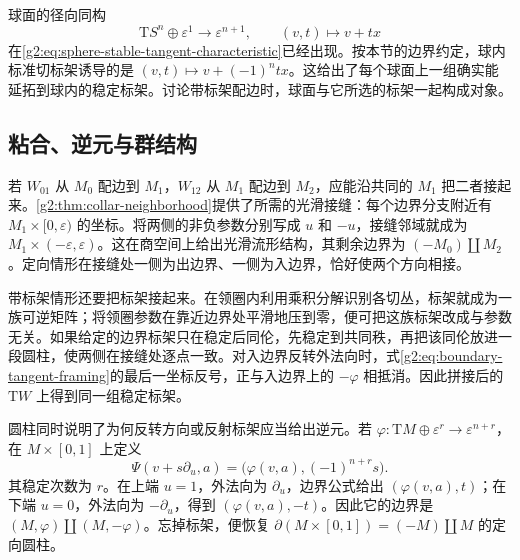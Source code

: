球面的径向同构
\[
	\mathrm TS^n\oplus\varepsilon^1\longrightarrow\varepsilon^{n+1},\qquad(v,t)\longmapsto v+tx
\]
在\cref{g2:eq:sphere-stable-tangent-characteristic}已经出现。按本节的边界约定，球内标准切标架诱导的是 \((v,t)\mapsto v+(-1)^ntx\)。这给出了每个球面上一组确实能延拓到球内的稳定标架。讨论带标架配边时，球面与它所选的标架一起构成对象。

\subsection{粘合、逆元与群结构}
\label{g2:subsec:2301:02}
若 \(W_{01}\) 从 \(M_0\) 配边到 \(M_1\)，\(W_{12}\) 从 \(M_1\) 配边到 \(M_2\)，应能沿共同的 \(M_1\) 把二者接起来。\cref{g2:thm:collar-neighborhood}提供了所需的光滑接缝：每个边界分支附近有 \(M_1\times[0,\varepsilon)\) 的坐标。将两侧的非负参数分别写成 \(u\) 和 \(-u\)，接缝邻域就成为 \(M_1\times(-\varepsilon,\varepsilon)\)。这在商空间上给出光滑流形结构，其剩余边界为 \((-M_0)\amalg M_2\)。定向情形在接缝处一侧为出边界、一侧为入边界，恰好使两个方向相接。

带标架情形还要把标架接起来。在领圈内利用乘积分解识别各切丛，标架就成为一族可逆矩阵；将领圈参数在靠近边界处平滑地压到零，便可把这族标架改成与参数无关。如果给定的边界标架只在稳定后同伦，先稳定到共同秩，再把该同伦放进一段圆柱，使两侧在接缝处逐点一致。对入边界反转外法向时，式\eqref{g2:eq:boundary-tangent-framing}的最后一坐标反号，正与入边界上的 \(-\varphi\) 相抵消。因此拼接后的 \(\mathrm TW\) 上得到同一组稳定标架。

圆柱同时说明了为何反转方向或反射标架应当给出逆元。若 \(\varphi:\mathrm TM\oplus\varepsilon^r\to\varepsilon^{n+r}\)，在 \(M\times[0,1]\) 上定义
\begin{equation}\label{g2:eq:framed-cylinder}
	\Psi(v+s\partial_u,a)=\bigl(\varphi(v,a),(-1)^{n+r}s\bigr).
\end{equation}
其稳定次数为 \(r\)。在上端 \(u=1\)，外法向为 \(\partial_u\)，边界公式给出 \((\varphi(v,a),t)\)；在下端 \(u=0\)，外法向为 \(-\partial_u\)，得到 \((\varphi(v,a),-t)\)。因此它的边界是 \((M,\varphi)\amalg(M,-\varphi)\)。忘掉标架，便恢复 \(\partial(M\times[0,1])=(-M)\amalg M\) 的定向圆柱。

